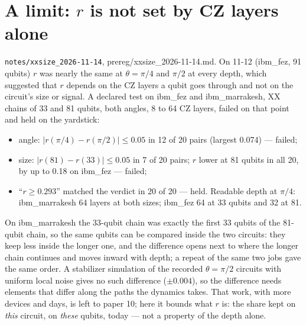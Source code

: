 \documentclass[10pt,a4paper]{article}
\begin{document}
\section{A limit: $r$ is not set by CZ layers alone}\label{sec:size}
\texttt{notes/xxsize\_2026-11-14}, prereg/xxsize\_2026-11-14.md. On 11-12 (ibm\_fez, 91 qubits) $r$ was nearly the same at
$\theta = \pi/4$ and $\pi/2$ at every depth, which suggested that $r$ depends on the CZ layers a qubit goes through and
not on the circuit's size or signal. A declared test on ibm\_fez and ibm\_marrakesh, XX chains of 33 and 81 qubits,
both angles, 8 to 64 CZ layers, failed on that point and held on the yardstick:
\begin{itemize}
\item angle: $|r(\pi/4) - r(\pi/2)| \le 0.05$ in 12 of 20 pairs (largest 0.074) --- failed;
\item size: $|r(81) - r(33)| \le 0.05$ in 7 of 20 pairs; $r$ lower at 81 qubits in all 20, by up to 0.18 on ibm\_fez ---
failed;
\item ``$r \ge 0.293$'' matched the verdict in 20 of 20 --- held. Readable depth at $\pi/4$: ibm\_marrakesh 64 layers at both
sizes; ibm\_fez 64 at 33 qubits and 32 at 81.
\end{itemize}
On ibm\_marrakesh the 33-qubit chain was exactly the first 33 qubits of the 81-qubit chain, so the same qubits can be
compared inside the two circuits: they keep less inside the longer one, and the difference opens next to where the
longer chain continues and moves inward with depth; a repeat of the same two jobs gave the same order. A stabilizer
simulation of the recorded $\theta = \pi/2$ circuits with uniform local noise gives no such difference ($\pm0.004$), so
the difference needs elements that differ along the paths the dynamics takes. That work, with more devices and days, is
left to paper 10; here it bounds what $r$ is: the share kept on \emph{this} circuit, on \emph{these} qubits, today ---
not a property of the depth alone.
\end{document}

